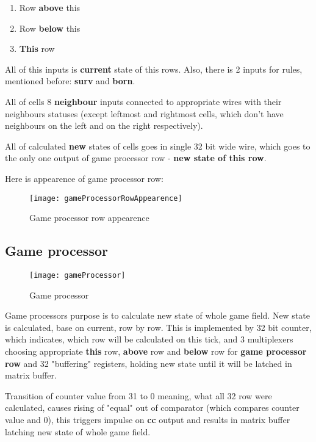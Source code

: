 \begin{enumerate}
	\item Row \textbf{above} this
	\item Row \textbf{below} this
	\item \textbf{This} row
\end{enumerate}

All of this inputs is \textbf{current} state of this rows.
Also, there is 2 inputs for rules, mentioned before: \textbf{surv} and \textbf{born}.

All of cells 8 \textbf{neighbour} inputs connected to appropriate wires with their neighbours statuses (except leftmost and rightmost cells, which don't have neighbours on the left and on the right respectively).

All of calculated \textbf{new} states of cells goes in single 32 bit wide wire, which goes to the only one output of game processor row - \textbf{new state of this row}.

Here is appearence of game processor row:

\begin{figure}[ht]
	\centering
	\texttt{[image: gameProcessorRowAppearence]}
	\caption{Game processor row appearence}
\end{figure}

\subsection*{Game processor}

\begin{figure}[ht]
	\centering
	\texttt{[image: gameProcessor]}
	\caption{Game processor}
\end{figure}

Game processors purpose is to calculate new state of whole game field. New state is calculated, base on current, row by row. This is implemented by 32 bit counter, which indicates, which row will be calculated on this tick, and 3 multiplexers choosing appropriate \textbf{this} row, \textbf{above} row and \textbf{below} row for \textbf{game processor row} and 32 "buffering" registers, holding new state until it will be latched in matrix buffer.

Transition of counter value from 31 to 0 meaning, what all 32 row were calculated, causes rising of "equal" out of comparator (which compares counter value and 0), this triggers impulse on \textbf{cc} output and results in matrix buffer latching new state of whole game field.


